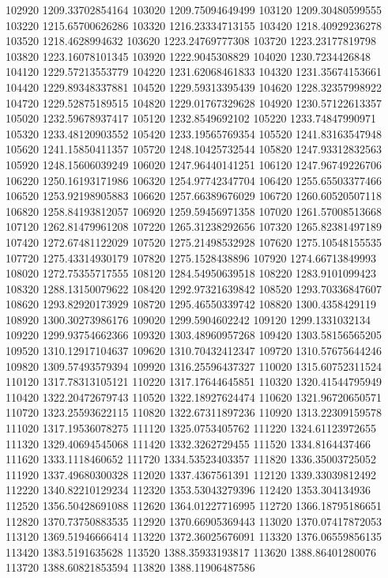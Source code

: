 {102920 1209.33702854164
103020 1209.75094649499
103120 1209.30480599555
103220 1215.65700626286
103320 1216.23334713155
103420 1218.40929236278
103520 1218.4628994632
103620 1223.24769777308
103720 1223.23177819798
103820 1223.16078101345
103920 1222.9045308829
104020 1230.7234426848
104120 1229.57213553779
104220 1231.62068461833
104320 1231.35674153661
104420 1229.89348337881
104520 1229.59313395439
104620 1228.32357998922
104720 1229.52875189515
104820 1229.01767329628
104920 1230.57122613357
105020 1232.59678937417
105120 1232.8549692102
105220 1233.74847990971
105320 1233.48120903552
105420 1233.19565769354
105520 1241.83163547948
105620 1241.15850411357
105720 1248.10425732544
105820 1247.93312832563
105920 1248.15606039249
106020 1247.96440141251
106120 1247.96749226706
106220 1250.16193171986
106320 1254.97742347704
106420 1255.65503377466
106520 1253.92198905883
106620 1257.66389676029
106720 1260.60520507118
106820 1258.84193812057
106920 1259.59456971358
107020 1261.57008513668
107120 1262.81479961208
107220 1265.31238292656
107320 1265.82381497189
107420 1272.67481122029
107520 1275.21498532928
107620 1275.10548155535
107720 1275.43314930179
107820 1275.1528438896
107920 1274.66713849993
108020 1272.75355717555
108120 1284.54950639518
108220 1283.9101099423
108320 1288.13150079622
108420 1292.97321639842
108520 1293.70336847607
108620 1293.82920173929
108720 1295.46550339742
108820 1300.4358429119
108920 1300.30273986176
109020 1299.5904602242
109120 1299.1331032134
109220 1299.93754662366
109320 1303.48960957268
109420 1303.58156565205
109520 1310.12917104637
109620 1310.70432412347
109720 1310.57675644246
109820 1309.57493579394
109920 1316.25596437327
110020 1315.60752311524
110120 1317.78313105121
110220 1317.17644645851
110320 1320.41544795949
110420 1322.20472679743
110520 1322.18927624474
110620 1321.96720650571
110720 1323.25593622115
110820 1322.67311897236
110920 1313.22309159578
111020 1317.19536078275
111120 1325.0753405762
111220 1324.61123972655
111320 1329.40694545068
111420 1332.3262729455
111520 1334.8164437466
111620 1333.1118460652
111720 1334.53523403357
111820 1336.35003725052
111920 1337.49680300328
112020 1337.4367561391
112120 1339.33039812492
112220 1340.82210129234
112320 1353.53043279396
112420 1353.304134936
112520 1356.50428691088
112620 1364.01227716995
112720 1366.18795186651
112820 1370.73750883535
112920 1370.66905369443
113020 1370.07417872053
113120 1369.51946666414
113220 1372.36025676091
113320 1376.06559856135
113420 1383.5191635628
113520 1388.35933193817
113620 1388.86401280076
113720 1388.60821853594
113820 1388.11906487586
}
